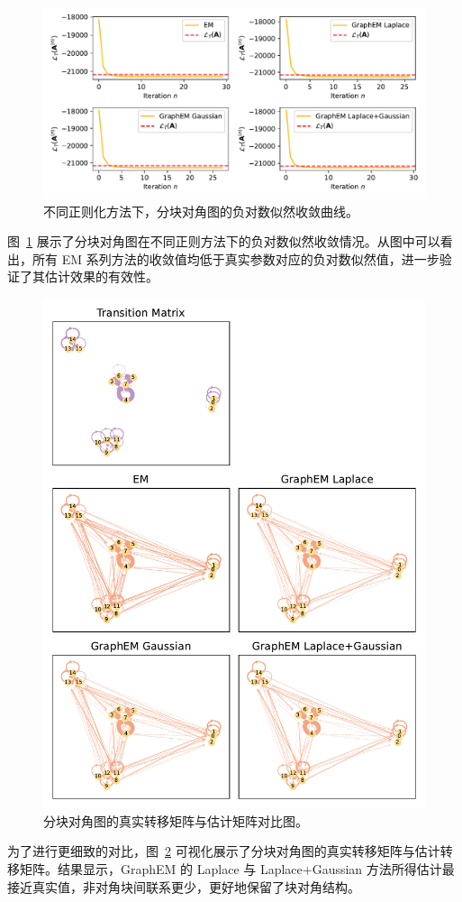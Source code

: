 \documentclass[presentation,aspectratio=169]{ctexbeamer}
\begin{document}
\begin{frame}
\begin{figure}[tb]
    \centering
    \includegraphics[width=0.75\linewidth]{fig/block diagonal/neg_log_likelihood.pdf}
    \caption{不同正则化方法下，分块对角图的负对数似然收敛曲线。}
    \label{fig: neg log likelihood}
\end{figure}

图~\ref{fig: neg log likelihood} 展示了分块对角图在不同正则方法下的负对数似然收敛情况。从图中可以看出，所有 EM 系列方法的收敛值均低于真实参数对应的负对数似然值，进一步验证了其估计效果的有效性。
\end{frame}


\begin{frame}
\begin{figure}[tb]
    \centering
    \includegraphics[width=0.3\linewidth]{fig/block diagonal/graphs_for_true_and_EM.pdf}
    \caption{分块对角图的真实转移矩阵与估计矩阵对比图。}
    \label{fig: graph comparison}
\end{figure}

为了进行更细致的对比，图~\ref{fig: graph comparison} 可视化展示了分块对角图的真实转移矩阵与估计转移矩阵。结果显示，GraphEM 的 Laplace 与 Laplace+Gaussian 方法所得估计最接近真实值，非对角块间联系更少，更好地保留了块对角结构。
\end{frame}
\end{document}
